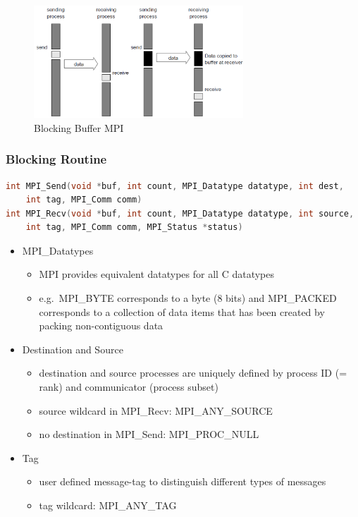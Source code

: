\begin{figure}[H]
\centering
\includegraphics[width=0.7\textwidth]{figures/blockingBufferMPI.png}
\caption{Blocking Buffer MPI}
\end{figure}

\hypertarget{blocking-routine}{%
\subsubsection{Blocking Routine}\label{blocking-routine}}

\begin{lstlisting}[language=C++]
int MPI_Send(void *buf, int count, MPI_Datatype datatype, int dest,
    int tag, MPI_Comm comm)
int MPI_Recv(void *buf, int count, MPI_Datatype datatype, int source,
    int tag, MPI_Comm comm, MPI_Status *status)
\end{lstlisting}

\begin{itemize}
\tightlist
\item
  MPI\_Datatypes

  \begin{itemize}
  \tightlist
  \item
    MPI provides equivalent datatypes for all C datatypes
  \item
    e.g.~MPI\_BYTE corresponds to a byte (8 bits) and MPI\_PACKED
    corresponds to a collection of data items that has been created by
    packing non-contiguous data
  \end{itemize}
\item
  Destination and Source

  \begin{itemize}
  \tightlist
  \item
    destination and source processes are uniquely defined by process ID
    (= rank) and communicator (process subset)
  \item
    source wildcard in MPI\_Recv: MPI\_ANY\_SOURCE
  \item
    no destination in MPI\_Send: MPI\_PROC\_NULL
  \end{itemize}
\item
  Tag

  \begin{itemize}
  \tightlist
  \item
    user defined message-tag to distinguish different types of messages
  \item
    tag wildcard: MPI\_ANY\_TAG
  \end{itemize}
\end{itemize}

